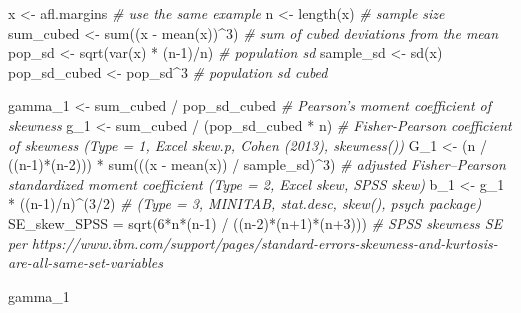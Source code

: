 \documentclass[
]{book}
\newenvironment{Shaded}{\begin{snugshade}}{\end{snugshade}}
\newcommand{\CommentTok}[1]{\textcolor[rgb]{0.56,0.35,0.01}{\textit{#1}}}
\newcommand{\DecValTok}[1]{\textcolor[rgb]{0.00,0.00,0.81}{#1}}
\newcommand{\FunctionTok}[1]{\textcolor[rgb]{0.00,0.00,0.00}{#1}}
\newcommand{\NormalTok}[1]{#1}
\newcommand{\OtherTok}[1]{\textcolor[rgb]{0.56,0.35,0.01}{#1}}
\newcommand{\SpecialCharTok}[1]{\textcolor[rgb]{0.00,0.00,0.00}{#1}}
\begin{document}
\begin{Shaded}
\begin{Highlighting}[]
\NormalTok{x }\OtherTok{\textless{}{-}}\NormalTok{ afl.margins }\CommentTok{\# use the same example}
\NormalTok{n }\OtherTok{\textless{}{-}} \FunctionTok{length}\NormalTok{(x) }\CommentTok{\# sample size}
\NormalTok{sum\_cubed }\OtherTok{\textless{}{-}} \FunctionTok{sum}\NormalTok{((x }\SpecialCharTok{{-}} \FunctionTok{mean}\NormalTok{(x))}\SpecialCharTok{\^{}}\DecValTok{3}\NormalTok{) }\CommentTok{\# sum of cubed deviations from the mean}
\NormalTok{pop\_sd }\OtherTok{\textless{}{-}} \FunctionTok{sqrt}\NormalTok{(}\FunctionTok{var}\NormalTok{(x) }\SpecialCharTok{*}\NormalTok{ (n}\DecValTok{{-}1}\NormalTok{)}\SpecialCharTok{/}\NormalTok{n) }\CommentTok{\# population sd}
\NormalTok{sample\_sd }\OtherTok{\textless{}{-}} \FunctionTok{sd}\NormalTok{(x)}
\NormalTok{pop\_sd\_cubed }\OtherTok{\textless{}{-}}\NormalTok{ pop\_sd}\SpecialCharTok{\^{}}\DecValTok{3} \CommentTok{\# population sd cubed}

\NormalTok{gamma\_1 }\OtherTok{\textless{}{-}}\NormalTok{ sum\_cubed }\SpecialCharTok{/}\NormalTok{ pop\_sd\_cubed  }\CommentTok{\# Pearson’s moment coefficient of skewness}
\NormalTok{g\_1 }\OtherTok{\textless{}{-}}\NormalTok{ sum\_cubed }\SpecialCharTok{/}\NormalTok{ (pop\_sd\_cubed }\SpecialCharTok{*}\NormalTok{ n) }\CommentTok{\# Fisher{-}Pearson coefficient of skewness (Type = 1, Excel skew.p, Cohen (2013), skewness())}
\NormalTok{G\_1 }\OtherTok{\textless{}{-}}\NormalTok{ (n }\SpecialCharTok{/}\NormalTok{ ((n}\DecValTok{{-}1}\NormalTok{)}\SpecialCharTok{*}\NormalTok{(n}\DecValTok{{-}2}\NormalTok{))) }\SpecialCharTok{*} \FunctionTok{sum}\NormalTok{(((x }\SpecialCharTok{{-}} \FunctionTok{mean}\NormalTok{(x)) }\SpecialCharTok{/}\NormalTok{ sample\_sd)}\SpecialCharTok{\^{}}\DecValTok{3}\NormalTok{)  }\CommentTok{\# adjusted Fisher–Pearson standardized moment coefficient (Type = 2, Excel skew, SPSS skew)}
\NormalTok{b\_1 }\OtherTok{\textless{}{-}}\NormalTok{ g\_1 }\SpecialCharTok{*}\NormalTok{ ((n}\DecValTok{{-}1}\NormalTok{)}\SpecialCharTok{/}\NormalTok{n)}\SpecialCharTok{\^{}}\NormalTok{(}\DecValTok{3}\SpecialCharTok{/}\DecValTok{2}\NormalTok{) }\CommentTok{\# (Type = 3, MINITAB, stat.desc, skew(), psych package)}
\NormalTok{SE\_skew\_SPSS }\OtherTok{=} \FunctionTok{sqrt}\NormalTok{(}\DecValTok{6}\SpecialCharTok{*}\NormalTok{n}\SpecialCharTok{*}\NormalTok{(n}\DecValTok{{-}1}\NormalTok{) }\SpecialCharTok{/}\NormalTok{ ((n}\DecValTok{{-}2}\NormalTok{)}\SpecialCharTok{*}\NormalTok{(n}\SpecialCharTok{+}\DecValTok{1}\NormalTok{)}\SpecialCharTok{*}\NormalTok{(n}\SpecialCharTok{+}\DecValTok{3}\NormalTok{))) }\CommentTok{\# SPSS skewness SE per https://www.ibm.com/support/pages/standard{-}errors{-}skewness{-}and{-}kurtosis{-}are{-}all{-}same{-}set{-}variables}

\NormalTok{gamma\_1}
\end{Highlighting}
\end{Shaded}
\end{document}

